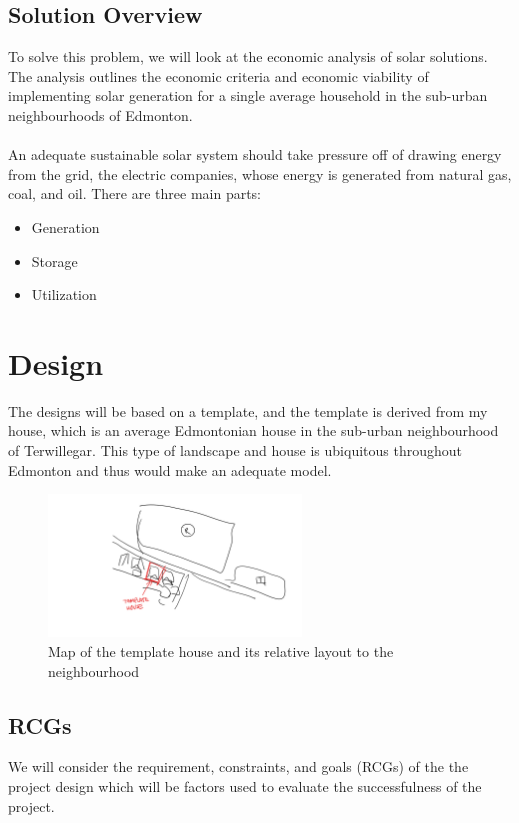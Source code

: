 \documentclass[10pt,letterpaper]{article}
\begin{document}
\subsection{Solution Overview}

To solve this problem, we will look at the economic analysis of solar solutions. The analysis outlines the economic criteria and economic viability of implementing solar generation for a single average household in the sub-urban neighbourhoods of Edmonton.\\
\\
An adequate sustainable solar system should take pressure off of drawing energy from the grid, the electric companies, whose energy is generated from natural gas, coal, and oil. There are three main parts:

\begin{itemize}
	\item Generation
	\item Storage
	\item Utilization
\end{itemize}

\section{Design}

The designs will be based on a template, and the template is derived from my house, which is an average Edmontonian house in the sub-urban neighbourhood of Terwillegar. This type of landscape and house is ubiquitous throughout Edmonton and thus would make an adequate model.\\

\begin{figure}[H]
	\centering
	\includegraphics[width=0.6\textwidth]{assets/template-house-map}
	\caption{Map of the template house and its relative layout to the neighbourhood}
	\label{fig:template-house-path}
\end{figure}


\subsection{RCGs}\label{subsection:rcgs}
We will consider the requirement, constraints, and goals (RCGs) of the the project design which will be factors used to evaluate the successfulness of the project.
\end{document}
